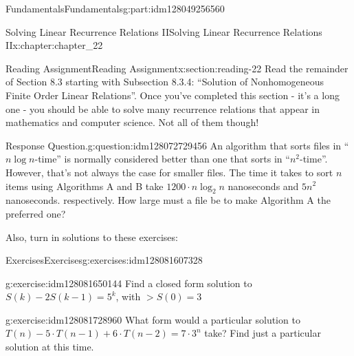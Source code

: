 \documentclass[oneside,10pt,]{book}
\numberwithin{equation}{section}
\begin{document}
\begin{partptx}{Fundamentals}{}{Fundamentals}{}{}{g:part:idm128049256560}
%
\typeout{************************************************}
\typeout{************************************************}
%
\begin{chapterptx}{Solving Linear Recurrence Relations II}{}{Solving Linear Recurrence Relations II}{}{}{x:chapter:chapter_22}
\index{}%
%
%
\typeout{************************************************}
\typeout{************************************************}
%
\begin{sectionptx}{Reading Assignment}{}{Reading Assignment}{}{}{x:section:reading-22}
Read the remainder of Section 8.3 starting with Subsection 8.3.4: “Solution of Nonhomogeneous Finite Order Linear Relations”. Once you've completed this section - it's a long one - you should be able to solve many recurrence relations that appear in mathematics and computer science.   Not all of them though!%
\begin{question}{Response Question.}{g:question:idm128072729456}%
An algorithm that sorts files in ``\(n \log{n}\)-time'' is normally considered better than one that sorts in ``\(n^2\)-time''.  However, that's not always the case for smaller files.  The time it takes to sort \(n\) items using Algorithms A and B take \(1200\cdot n \log_2{n}\) nanoseconds and \(5 n^2\) nanoseconds. respectively. How large must a file be to make Algorithm A the preferred one?%
\end{question}
Also, turn in solutions to these exercises:%
%
%
\typeout{************************************************}
\typeout{************************************************}
%
\begin{exercises-subsection}{Exercises}{}{Exercises}{}{}{g:exercises:idm128081607328}
\par\medskip\noindent%
%
\begin{exercisegroup}
\begin{divisionexerciseeg}{1}{}{}{g:exercise:idm128081650144}%
Find a closed form solution to \(S(k) - 2 S (k - 1) = 5^k\), with \(>S(0) = 3\)%
\end{divisionexerciseeg}%
\begin{divisionexerciseeg}{2}{}{}{g:exercise:idm128081728960}%
What form would a particular solution to \(T(n)-5\cdot T(n-1)+6\cdot T(n-2)=7 \cdot 3^n\) take?  Find just a particular solution at this time.%
\end{divisionexerciseeg}%
\end{exercisegroup}

\end{exercises-subsection}
\end{sectionptx}
\end{chapterptx}
\end{partptx}
\end{document}
